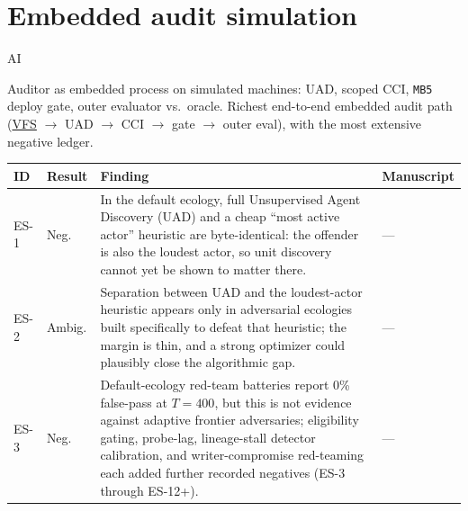 \section{Embedded audit simulation}
\label{sec:appn-embedded-simulation}
\begin{authbar}{AI}

Auditor as embedded process on simulated machines: UAD, scoped CCI, \texttt{MB5} deploy gate, outer evaluator vs.\ oracle. Richest end-to-end embedded audit path (\hyperref[gloss:vfs]{VFS} $\to$ UAD $\to$ CCI $\to$ gate $\to$ outer eval), with the most extensive negative ledger.

\small
\setlength{\tabcolsep}{3pt}
\renewcommand{\arraystretch}{1.2}
\end{authbar}
\begin{longtable}{@{}L{0.05\textwidth}L{0.08\textwidth}L{0.55\textwidth}L{0.255\textwidth}@{}}
\toprule
\textbf{ID} & \textbf{Result} & \textbf{Finding} & \textbf{Manuscript} \\
\midrule
\endhead
\bottomrule
\endfoot
\label{finding:es-1}ES-1 & Neg. & In the default ecology, full Unsupervised Agent Discovery (UAD) and a cheap ``most active actor'' heuristic are byte-identical: the offender is also the loudest actor, so unit discovery cannot yet be shown to matter there. & --- \\
\label{finding:es-2}ES-2 & Ambig. & Separation between UAD and the loudest-actor heuristic appears only in adversarial ecologies built specifically to defeat that heuristic; the margin is thin, and a strong optimizer could plausibly close the algorithmic gap. & --- \\
\label{finding:es-3}ES-3 & Neg. & Default-ecology red-team batteries report 0\% false-pass at $T=400$, but this is not evidence against adaptive frontier adversaries; eligibility gating, probe-lag, lineage-stall detector calibration, and writer-compromise red-teaming each added further recorded negatives (ES-3 through ES-12+). & --- \\
\end{longtable}
\normalsize
\renewcommand{\arraystretch}{1.0}

\authbarneedspace
